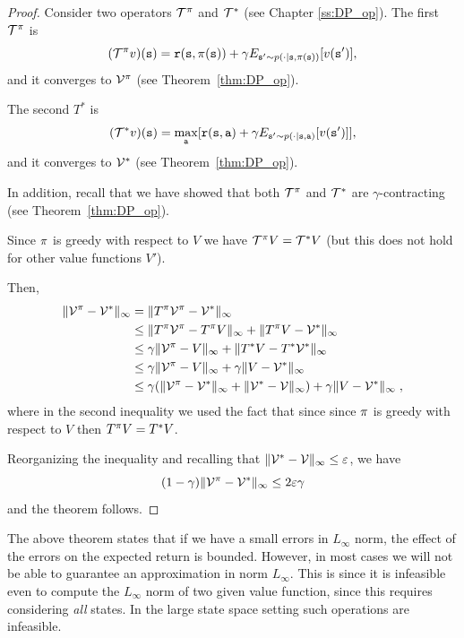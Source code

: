 \begin{proof}
Consider two operators $\mathcal{T}^\pi$ and $\mathcal{T}^*$ (see
Chapter \ref{ss:DP_op}). The first $\mathcal{T}^\pi$ is
\[
(\mathcal{T}^\pi v)({\tt s})={\tt r}({\tt s},\pi({\tt s}))+\gamma
E_{{\tt s}'\sim p(\cdot|{\tt s},\pi({\tt s}))}[v({\tt s}')],
\]
and it converges to $\mathcal{V}^\pi$ (see Theorem~\ref{thm:DP_op}).


The second $T^*$ is
\[
(\mathcal{T}^* v)({\tt s})=\max_{\tt a}[{\tt r}({\tt s},{\tt a})+\gamma
E_{{\tt s}'\sim p(\cdot|{\tt s},{\tt a})}[v({\tt s}')] ],
\]
and it converges to $\mathcal{V}^*$ (see Theorem~\ref{thm:DP_op}).

In addition, recall that we have showed that both
$\mathcal{T}^\pi$ and $\mathcal{T}^*$ are $\gamma$-contracting (see
Theorem~\ref{thm:DP_op}).

Since $\pi$ is greedy with respect to $V$ we have
$\mathcal{T}^\pi V=\mathcal{T}^* V$ (but this does not hold for
other value functions $V'$).

Then,
\begin{align*}
\|\mathcal{V}^\pi-\mathcal{V}^*\|_\infty &= \|T^\pi \mathcal{V}^\pi - \mathcal{V}^*\|_\infty\\
&\leq \|T^\pi \mathcal{V}^\pi -T^\pi V\|_\infty +\|T^\pi V - \mathcal{V}^*\|_\infty\\
&\leq \gamma\| \mathcal{V}^\pi - V\|_\infty +\|T^* V - T^*\mathcal{V}^*\|_\infty\\
&\leq \gamma\| \mathcal{V}^\pi - V\|_\infty +\gamma\| V - \mathcal{V}^*\|_\infty\\
&\leq \gamma(\| \mathcal{V}^\pi - \mathcal{V}^*\|_\infty+ \|\mathcal{V}^*-\mathcal{V}\|_\infty ) +\gamma\| V - \mathcal{V}^*\|_\infty\;,
\end{align*}
where in the second inequality we used the fact that since since
$\pi$ is greedy with respect to $V$ then $T^\pi V=T^* V$.

Reorganizing the inequality and recalling that
$\|\mathcal{V}^*-\mathcal{V}\|_\infty\leq \varepsilon$, we have
\[
(1-\gamma)\|\mathcal{V}^\pi-\mathcal{V}^*\|_\infty \leq 2\varepsilon\gamma
\]
and the theorem follows.
\end{proof}

The above theorem states that if we have a small errors in
$L_\infty$ norm, the effect of the errors on the expected return is
bounded. However, in most cases we will not be able to guarantee an
approximation in norm $L_\infty$. This is since it is infeasible even
to compute the $L_\infty$ norm of two given value function, since
this requires considering {\em all} states. In the large state space
setting such operations are infeasible.

